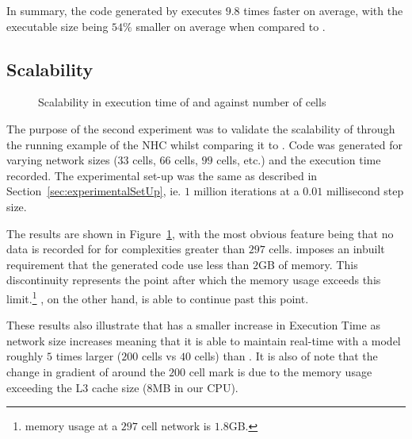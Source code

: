 In summary, the code generated by \ourTool executes $9.8$ times faster on average, with the executable size being $54\%$ smaller on average when compared to \simulink.
\



\subsection{Scalability}

\begin{figure}[htbp]
	\centering
	
	\caption{Scalability in  execution time of \simulink and \ourTool against number of cells}
	\label{fig:scalability}
\end{figure}

The purpose of the second experiment was to validate the scalability of \ourTool through the running example of the \ac{NHC} whilst comparing it to \simulink.
Code was generated for varying network sizes ($33$ cells, $66$ cells, $99$ cells, etc.) and the execution time recorded.
The experimental set-up was the same as described in Section~\ref{sec:experimentalSetUp}, ie. $1$ million iterations at a $0.01$ millisecond step size.

The results are shown in Figure~\ref{fig:scalability}, with the most obvious feature being that no data is recorded for \simulink for complexities greater than $297$ cells.
\simulink imposes an inbuilt requirement that the generated code use less than $2$GB of memory. This discontinuity represents the point after which the memory usage exceeds this limit.\footnote{\simulink memory usage at a $297$ cell network is $1.8$GB.}
\ourTool, on the other hand, is able to continue past this point.

These results also illustrate that \ourTool has a smaller increase in Execution Time as network size increases meaning that it is able to maintain real-time with a model roughly $5$ times larger ($200$ cells vs $40$ cells) than \simulink.
It is also of note that the change in gradient of \ourTool around the $200$ cell mark is due to the memory usage exceeding the L$3$ cache size ($8$MB in our CPU).